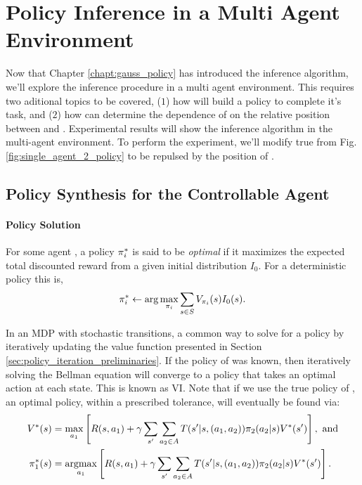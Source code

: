 \chapter{Policy Inference in a Multi Agent Environment}\label{chapt:multi_agent}

Now that Chapter \ref{chapt:gauss_policy} has introduced the inference algorithm, we'll explore the inference procedure
in a multi agent environment. This requires two aditional topics to be covered, ($1$) how  will build a policy
to complete it's task, and ($2$) how  can determine the dependence of  on the relative position
between  and .  Experimental results will show the inference algorithm in the multi-agent environment.
To perform the experiment, we'll modify true  from Fig. \ref{fig:single_agent_2_policy} to be repulsed by the
position of .

\section{Policy Synthesis for the Controllable Agent}\label{sec:preliminaries}




\subsubsection{Policy Solution}
    For some agent , a policy $\pi_{i}^*$ is said to be \textit{optimal} if it maximizes the
    expected total discounted reward from a given initial distribution $I_0$. For a deterministic policy this is,
    \begin{equation}\label{eq:policy_hard_max}
        \pi_{i}^* \leftarrow \arg\max_{\pi_{i}}\sum_{s\in S} V_{\pi_{i}}(s)I_0(s) .
    \end{equation}

    In an \ac{MDP} with stochastic transitions, a common way to solve for a policy by iteratively updating the value
    function presented in Section \ref{sec:policy_iteration_preliminaries}. If the policy of  was known, then
    iteratively solving the Bellman equation \cite{hernandez2012adaptive} will converge to a policy that takes an
    optimal action at each state. This is known as \acf{VI}. Note that if we use the true policy of , an
    optimal policy, within a prescribed tolerance, will eventually be found via:
    \begin{equation}\label{eq:bellman_true}
        \begin{aligned}
                V^*(s) &= \max_{a_1}\left[R(s,a_1) +
                    \gamma\sum_{s'}\sum_{a_2\in A}T(s'|s,(a_1,a_2))\pi_{2}(a_2|s) V^*(s')\right],\ \text{and}\\
                \pi_{1}^*(s) &= \mathop{\mathrm{argmax}}_{a_1}\left[R(s,a_1) +
                    \gamma\sum_{s'}\sum_{a_2\in A}T(s'|s,(a_1,a_2))\pi_{2}(a_2|s)V^*(s')\right].
        \end{aligned}
    \end{equation}

